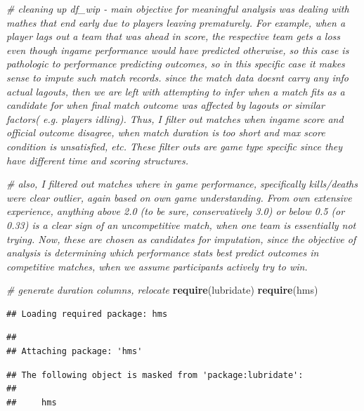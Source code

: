 \documentclass[
]{article}
\newenvironment{Shaded}{\begin{snugshade}}{\end{snugshade}}
\newcommand{\CommentTok}[1]{\textcolor[rgb]{0.56,0.35,0.01}{\textit{#1}}}
\newcommand{\FunctionTok}[1]{\textcolor[rgb]{0.13,0.29,0.53}{\textbf{#1}}}
\newcommand{\NormalTok}[1]{#1}
\begin{document}
\begin{Shaded}
\begin{Highlighting}[]
\CommentTok{\# cleaning up df\_wip {-} main objective for meaningful analysis was dealing with mathes that end early due to players leaving prematurely. For example, when a player lags out a team that was ahead in score, the respective team gets a loss even though ingame performance would have predicted otherwise, so this case is pathologic to performance predicting outcomes, so in this specific case it makes sense to impute such match records. since the match data doesn\textquotesingle{}t carry any info actual lagouts, then we are left with attempting to infer when a match fits as a candidate for when final match outcome was affected by lagouts or similar factors( e.g. players idling). Thus, I filter out matches when ingame score and official outcome disagree, when match duration is too short and max score condition is unsatisfied, etc. These filter outs are game type specific since they have different time and scoring structures.}

\CommentTok{\# also, I filtered out matches where in game performance, specifically kills/deaths were clear outlier, again based on own game understanding. From own extensive experience, anything above 2.0 (to be sure, conservatively 3.0) or below 0.5 (or 0.33) is a clear sign of an uncompetitive match, when one team is essentially not trying. Now, these are chosen as candidates for imputation, since the objective of analysis is determining which performance stats best predict outcomes in competitive matches, when we assume participants actively try to win.}

\CommentTok{\# generate duration columns, relocate}
\FunctionTok{require}\NormalTok{(lubridate)}
\FunctionTok{require}\NormalTok{(hms)}
\end{Highlighting}
\end{Shaded}

\begin{verbatim}
## Loading required package: hms
\end{verbatim}

\begin{verbatim}
## 
## Attaching package: 'hms'
\end{verbatim}

\begin{verbatim}
## The following object is masked from 'package:lubridate':
## 
##     hms
\end{verbatim}
\end{document}

